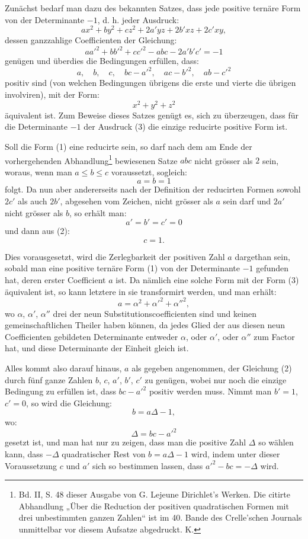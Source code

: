 \documentclass[11pt]{article}
\begin{document}
Zunächst bedarf man dazu des bekannten Satzes, dass jede positive ternäre Form von der Determinante $-1$, d. h. jeder Ausdruck:
\begin{equation}\tag{1}
 ax^2+by^2+cz^2+2a'yz+2b'xz+2c'xy,
\end{equation}
dessen ganzzahlige Coefficienten der Gleichung:
\begin{equation}\tag{2}
 aa'^2+bb'^2+cc'^2-abc-2a'b'c'=-1
\end{equation}
genügen und überdies die Bedingungen erfüllen, dass:
\[
 a,\quad b,\quad c,\quad bc-a'^2,\quad ac-b'^2,\quad ab-c'^2
\]
positiv sind (von welchen Bedingungen übrigens die erste und vierte die übrigen involviren), mit der Form:
\begin{equation}\tag{3}
 x^2+y^2+z^2
\end{equation}
äquivalent ist. Zum Beweise dieses Satzes genügt es, sich zu überzeugen, dass für die Determinante $-1$ der Ausdruck (3) die einzige reducirte positive Form ist.

Soll die Form (1) eine reducirte sein, so darf nach dem am Ende der vorhergehenden Abhandlung\footnote{Bd. II, S. 48 dieser Ausgabe von G. Lejeune Dirichlet's Werken. Die citirte Abhandlung „Über die Reduction der positiven quadratischen Formen mit drei unbestimmten ganzen Zahlen“ ist im 40. Bande des Crelle'schen Journals unmittelbar vor diesem Aufsatze abgedruckt. K.} bewiesenen Satze $abc$ nicht grösser als $2$ sein, woraus, wenn man $a\leq b\leq c$ voraussetzt, sogleich:
\[
 a=b=1
\]
folgt. Da nun aber andererseits nach der Definition der reducirten Formen sowohl $2c'$ als auch $2b'$, abgesehen vom Zeichen, nicht grösser als $a$ sein darf und $2a'$ nicht grösser als $b$, so erhält man:
\[
 a'=b'=c'=0
\]
und dann aus (2):
\[
 c=1.
\]

Dies vorausgesetzt, wird die Zerlegbarkeit der positiven Zahl $a$ dargethan sein, sobald man eine positive ternäre Form (1) von der Determinante $-1$ gefunden hat, deren erster Coefficient $a$ ist. Da nämlich eine solche Form mit der Form (3) äquivalent ist, so kann letztere in sie transformirt werden, und man erhält:
\[
 a=\alpha^2+\alpha'^2+\alpha''^2,
\]
wo $\alpha$, $\alpha'$, $\alpha''$ drei der neun Substitutionscoefficienten sind und keinen gemeinschaftlichen Theiler haben können, da jedes Glied der aus diesen neun Coefficienten gebildeten Determinante entweder $\alpha$, oder $\alpha'$, oder $\alpha''$ zum Factor hat, und diese Determinante der Einheit gleich ist.

Alles kommt also darauf hinaus, $a$ als gegeben angenommen, der Gleichung (2) durch fünf ganze Zahlen $b$, $c$, $a'$, $b'$, $c'$ zu genügen, wobei nur noch die einzige Bedingung zu erfüllen ist, dass $bc-a'^2$ positiv werden muss. Nimmt man $b'=1$, $c'=0$, so wird die Gleichung:
\[
 b=a\Delta-1,
\]
wo:
\[
 \Delta=bc-a'^2
\]
gesetzt ist, und man hat nur zu zeigen, dass man die positive Zahl $\Delta$ so wählen kann, dass $-\Delta$ quadratischer Rest von $b=a\Delta-1$ wird, indem unter dieser Voraussetzung $c$ und $a'$ sich so bestimmen lassen, dass $a'^2-bc=-\Delta$ wird.
\end{document}

